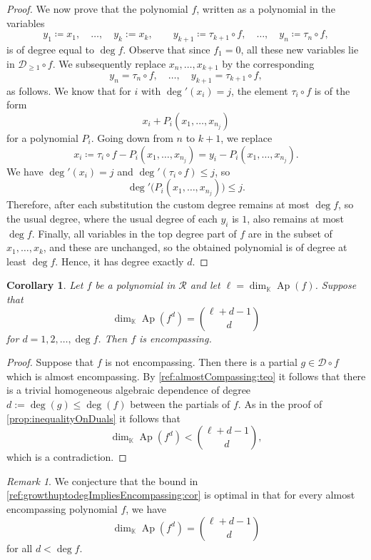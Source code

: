 \documentclass[a4paper,11pt,reqno]{amsart}
\newcommand{\calD}{\mathcal{D}}
\newcommand{\calR}{\mathcal{R}}
\newcommand{\bbK}{\mathbb{K}}
\DeclareMathOperator{\Ap}{Ap}
\newcommand{\oldtext}[1]{\textcolor{darkelectricblue}{#1}}
\numberwithin{equation}{section}
\theoremstyle{definition}
\theoremstyle{plain}
\newtheorem{cor}[defn]{Corollary}
\theoremstyle{remark}
\newtheorem{rem}[defn]{Remark}
\begin{document}
\begin{proof}
        We now prove that the polynomial $f$, written as a polynomial {in the variables}
        \[y_1\coloneqq x_1,\quad \ldots,\quad y_k:=x_k,\qquad y_{k+1}\coloneqq\tau_{k+1}\circ f,\quad \ldots ,\quad y_n\coloneqq\tau_n\circ f,\]
        is of degree equal to $\deg f$. Observe that since $f_1 = 0$, all
        these new variables lie in $\calD_{\geq 1} \circ f$.
     We
     subsequently replace $x_n, \ldots ,x_{k+1}$ by the corresponding
        {\[ y_n=\tau_n\circ f,\quad \ldots ,\quad y_{k+1}=\tau_{k+1}\circ f,\]}
        as follows. We know
        that for $i$ with $\deg'(x_i) = j$, the element $\tau_i\circ f$ is of
        the form
        \[
            x_i + P_i(x_1, \ldots ,x_{n_{j}})
        \]
        for a polynomial $P_i$.
        Going down from $n$ to $k+1$, we replace \[x_i \coloneqq \tau_i \circ f -P_i(x_1, \ldots ,x_{n_{j}})=y_i-P_i(x_1, \ldots ,x_{n_{j}}).\] We have $\deg'(x_i) = j$ and
        $\deg'(\tau_i \circ f) \leq j$, so \[\deg'\bigl(P_i(x_1, \ldots
        ,x_{n_{j}})\bigr)\leq j.\]
Therefore, after each substitution the custom
        degree remains at most $\deg f$, so the usual degree, where the usual degree of each $y_i$ {is $1$}, also remains at most
        $\deg f$.
        Finally, all variables in the top degree part of $f$ are in the subset
        of $x_1, \ldots ,x_k$, and these are unchanged, so the obtained
        polynomial is of degree at least $\deg f$. Hence, it has degree
        exactly $d$.
\end{proof}

\begin{cor}\label{ref:growthuptodegImpliesEncompassing:cor}
    Let {$f$ be a polynomial} {in $\calR$} and let $\ell = \dim_{\bbK} \Ap(f)$. Suppose that
    \[
        \dim_{\bbK} \Ap(f^d) = \binom{\ell+d-1}{d}
    \]
    for $d=1,2, \ldots ,\deg f$. Then $f$ is encompassing.
\end{cor}
\begin{proof}
    Suppose that $f$ is not encompassing. Then there is a partial $g\in
    \calD\circ f$ which
    is almost encompassing. By \autoref{ref:almostCompassing:teo} it follows
    that there is a trivial homogeneous algebraic dependence of degree
    $d := \deg(g) \leq \deg(f)$ {between} the partials of $f$. As in the proof of
    \autoref{prop:inequalityOnDuals} it follows that \[\dim_{\bbK} \Ap(f^d) <
    \binom{\ell+d-1}{d},\] which is a contradiction.
\end{proof}
\begin{rem}
    We conjecture that the bound in
    \autoref{ref:growthuptodegImpliesEncompassing:cor} is optimal in that for
    every almost encompassing polynomial $f$, we have \[\dim_{\bbK}\Ap(f^d)
    =\binom{\ell+d-1}{d}\] for all $d < \deg f$.
\end{rem}
\end{document}
